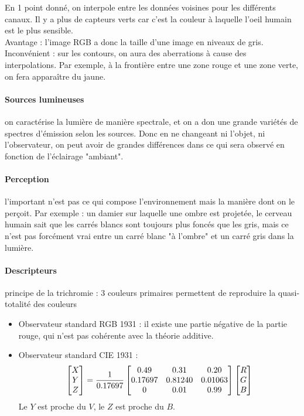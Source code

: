 \documentclass[main.tex]{subfiles}
\begin{document}
En 1 point donné, on interpole entre les données voisines pour les différents canaux.
Il y a plus de capteurs verts car c'est la couleur à laquelle l'oeil humain est le plus sensible.\\

Avantage : l'image RGB a donc la taille d'une image en niveaux de gris. \\

Inconvénient : sur les contours, on aura des aberrations à cause des interpolations. Par exemple, à la frontière entre une zone rouge et une zone verte, on fera apparaître du jaune.

\paragraph{Sources lumineuses} on caractérise la lumière de manière spectrale, et on a don une grande variétés de spectres d'émission selon les sources. Donc en ne changeant ni l'objet, ni l'observateur, on peut avoir de grandes différences dans ce qui sera observé en fonction de l'éclairage "ambiant".

\paragraph{Perception} l'important n'est pas ce qui compose l'environnement mais la manière dont on le perçoit. Par exemple : un damier sur laquelle une ombre est projetée, le cerveau humain sait que les carrés blancs sont toujours plus foncés que les gris, mais ce n'est pas forcément vrai entre un carré blanc "à l'ombre" et un carré gris dans la lumière.

\paragraph{Descripteurs} principe de la trichromie : 3 couleurs primaires permettent de reproduire la quasi-totalité des couleurs

\begin{itemize}
\item Observateur standard RGB 1931 : il existe une partie négative de la partie rouge, qui n'est pas cohérente avec la théorie additive.
\item Observateur standard CIE 1931 :
  \[ \begin{bmatrix}  X \\ Y \\ Z  \end{bmatrix} = \frac{1}{0.17697}
    \begin{bmatrix}
    0.49 & 0.31 & 0.20\\
    0.17697 & 0.81240 & 0.01063\\
    0 & 0.01 & 0.99
  \end{bmatrix}
    \begin{bmatrix}  R \\ G \\ B  \end{bmatrix} \]
Le $Y$ est proche du $V$, le $Z$ est proche du $B$.
\end{itemize}
\end{document}
